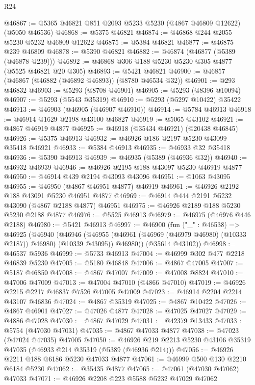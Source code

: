 \begin{lexlean}{R24}
\begin{coremodule}
@46867 := @5365 @46821 @851 @2093 @5233 @5230 (@4867 @46809 @12622) (@5050 @46536)
@46868 := @5375 @46821
@46874 := @46868 @244 @2055 @5230 @5232 @46809 @12622
@46875 := @5384 @46821
@46877 := @46875 @239 @46809
@46878 := @5390 @46821
@46882 := @46874 (@46877 (@5389 (@46878 @239)))
@46892 := @46868 @306 @188 @5230 @5230 @305 @4877 (@5525 @46821 @20 @305)
@46893 := @5421 @46821
@46900 := @46857 (@46867 (@46882 (@46892 @46893)) (@8780 @46534 @32))
@46901 := @293 @46832
@46903 := @5293 (@8708 @46901)
@46905 := @5293 (@8396 @10094)
@46907 := @5293 (@5543 @35319)
@46910 := @5293 (@5297 @10422) @35422
@46913 := @46903 (@46905 (@46907 @46910))
@46914 := @5784 @46913
@46918 := @46914 @1629 @2198 @43100 @46827
@46919 := @5065 @43102
@46921 := @4867 @46919 @4877
@46925 := @46918 (@35434 @46921) (@20438 @46845)
@46926 := @5375 @46913
@46932 := @46926 @186 @2197 @5230 @43099 @35418 @46921
@46933 := @5384 @46913
@46935 := @46933 @32 @35418
@46936 := @5390 @46913
@46939 := @46935 (@5389 (@46936 @32))
@46940 := @46932 @46939
@46946 := @46926 @2195 @188 @43097 @5230 @46919 @4877
@46950 := @46914 @439 @2194 @43093 @43096
@46951 := @1063 @43095
@46955 := @46950 (@4867 @46951 @4877) @46919
@46961 := @46926 @2192 @188 @43091 @5230 @46951 @4877
@46969 := @46914 @444 @2191 @5232 @43090 (@4867 @2188 @4877) @46951
@46975 := @46926 @2189 @188 @5230 @5230 @2188 @4877
@46976 := @5525 @46913
@46979 := @46975 (@46976 @446 @2188)
@46980 := @5421 @46913
@46997 := @46900
    (fun ("_" : @46538) =>
    @46925
      (@46940
        (@46946
          (@46955 (@46961 (@46969 (@46979 @46980) (@10333 @2187)) @46980) (@10339 @43095))
          @46980))
      (@35614 @43102))
@46998 := @46537 @5936
@46999 := @5733 @46913
@47004 := @46999 @302 @477 @2218 @46839 @5230
@47005 := @5180 @46848
@47006 := @4867 @47005
@47007 := @5187 @46850
@47008 := @4867 @47007
@47009 := @47008 @8824
@47010 := @47006 @47009
@47013 := @47004 @47010 (@4866 @47010)
@47019 := @46926 @2215 @2217 @46837 @7526 @47005 @47009
@47023 := @46914 @2204 @2214 @43107 @46836
@47024 := @4867 @35319
@47025 := @4867 @10422
@47026 := @4867 @46901
@47027 := @47026 @4877
@47028 := @47025 @47027
@47029 := @4886 @47028
@47030 := @4867 @47029
@47031 := @42379 @13433
@47033 := @5754 (@47030 @47031)
@47035 := @4867 @47033 @4877
@47038 := @47023 (@47024 @47035) @47005
@47050 := @46926 @219 @2213 @5230 @43106 @35319 @47035 (@46933 @214 @35319 (@5389 (@46936 @214)))
@47056 := @46926 @2211 @188 @6186 @5230 @47033 @4877
@47061 := @46999 @500 @130 @2210 @6184 @5230
@47062 := @35435 @4877
@47065 := @47061 (@47030 @47062) @47033
@47071 := @46926 @2208 @223 @5588 @5232 @47029 @47062

\end{coremodule}
\end{lexlean}
